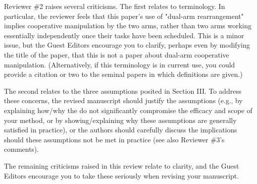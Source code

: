 \documentclass[journal]{IEEEtran}
\begin{document}
	
	\begin{partt}
		Reviewer \#2 raises several criticisms.  The first relates to terminology. In particular, the reviewer feels that this paper’s use of "dual-arm rearrangement" implies cooperative manipulation by the two arms, rather than two arms working essentially independently once their tasks have been scheduled. This is a minor issue, but the Guest Editors encourage you to clarify, perhaps even by modifying the title of the paper, that this is not a paper about dual-arm cooperative manipulation. (Alternatively, if this terminology is in current use, you could provide a citation or two to the seminal papers in which definitions are given.)  
	\end{partt}
	
	
	\begin{partt}
		The second relates to the three assumptions posited in Section III. To address these concerns, the revised manuscript should justify the assumptions (e.g., by  explaining how/why the do not significantly compromise the efficacy and scope of your method, or by showing/explaining why these assumptions are generally satisfied in practice), or the authors should carefully discuss the implications should these assumptions not be met in practice (see also Reviewer \#3's comments).
	\end{partt}
	
	
	\begin{partt}
		The remaining criticisms raised in this review relate to clarity, and the Guest Editors encourage you to take these seriously when revising your manuscript.
	\end{partt}
	
\end{document}
